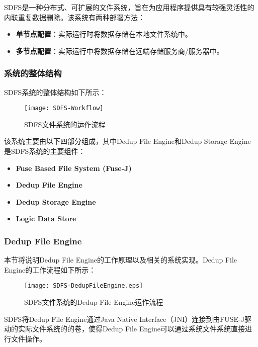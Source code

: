 SDFS是一种分布式、可扩展的文件系统，旨在为应用程序提供具有较强灵活性的内联重复数据删除。该系统有两种部署方法：

\begin{itemize}
    \item \textbf{单节点配置}：实际运行时将数据存储在本地文件系统中。
    \item \textbf{多节点配置}：实际运行中将数据存储在远端存储服务商/服务器中。
\end{itemize}

\subsubsection{系统的整体结构}

\par SDFS系统的整体结构如下所示：

\begin{figure}[!htb]
    \small
    \centering
    \texttt{[image: SDFS-Workflow]}
    \caption{SDFS文件系统的运作流程} 
    \label{fig:SDFS-Workflow}
\end{figure}


该系统主要由以下四部分组成，其中Dedup File Engine和Dedup Storage Engine是SDFS系统的主要组件：

\begin{itemize}
    \item \textbf{Fuse Based File System (Fuse-J)}
    \item \textbf{Dedup File Engine}
    \item \textbf{Dedup Storage Engine}
    \item \textbf{Logic Data Store}
\end{itemize}


\subsubsection{Dedup File Engine}
本节将说明Dedup File Engine的工作原理以及相关的系统实现。Dedup File Engine的工作流程如下所示： 

\begin{figure}[!htb]
    \small
    \centering
    \texttt{[image: SDFS-DedupFileEngine.eps]}
    \caption{SDFS文件系统的Dedup File Engine运作流程} 
    \label{fig:SDFS-DedupFileEngine}
\end{figure}

SDFS将Dedup File Engine通过Java Native Interface（JNI）连接到由FUSE-J驱动的实际文件系统的的卷，使得Dedup File Engine可以通过系统文件系统直接进行文件操作。


